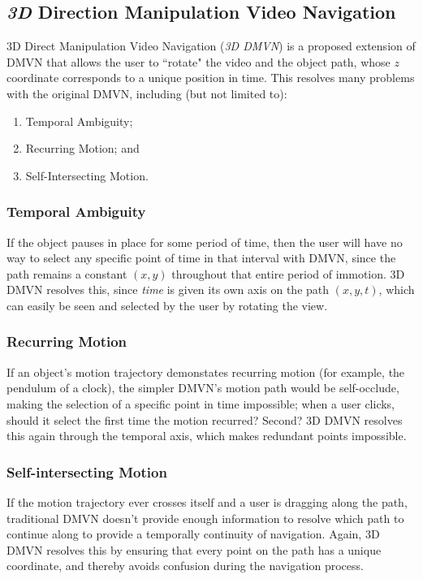 \subsection{\emph{3D} Direction Manipulation Video Navigation}
3D Direct Manipulation Video Navigation (\emph{3D DMVN}) is a proposed extension of DMVN that allows the user to ``rotate" the video and the object path, whose $z$ coordinate corresponds to a unique position in time. This resolves many problems with the original DMVN, including (but not limited to): \cite{dmvn3d}
\begin{enumerate}
\item Temporal Ambiguity;
\item Recurring Motion; and
\item Self-Intersecting Motion.
\end{enumerate}

\subsubsection {Temporal Ambiguity}
    If the object pauses in place for some period of time, then the user will have no way to select any specific point of time in that interval with DMVN, since the path remains a constant $(x,y)$ throughout that entire period of immotion. 3D DMVN resolves this, since \emph{time} is given its own axis on the path $(x,y,t)$, which can easily be seen and selected by the user by rotating the view.
\subsubsection{Recurring Motion}
    If an object's motion trajectory demonstates recurring motion (for example, the pendulum of a clock), the simpler DMVN's motion path would be self-occlude, making the selection of a specific point in time impossible; when a user clicks, should it select the first time the motion recurred? Second? 3D DMVN resolves this again through the temporal axis, which makes redundant points impossible.
\subsubsection{Self-intersecting Motion}
    If the motion trajectory ever crosses itself and a user is dragging along the path, traditional DMVN doesn't provide enough information to resolve which path to continue along to provide a temporally continuity of navigation. Again, 3D DMVN resolves this by ensuring that every point on the path has a unique coordinate, and thereby avoids confusion during the navigation process.
